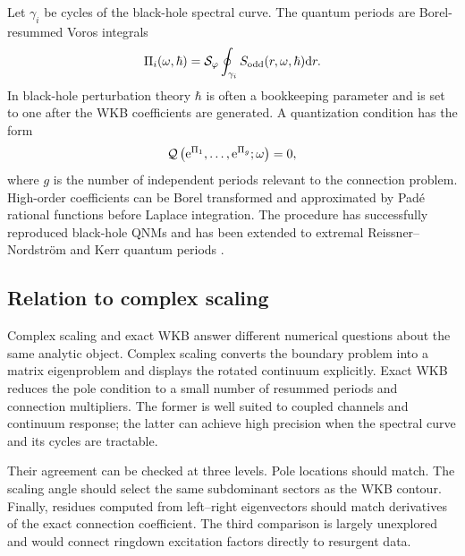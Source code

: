 Let $\gamma_i$ be cycles of the black-hole spectral curve.  The quantum
periods are Borel-resummed Voros integrals
\begin{equation}
  \Pi_i(\omega,\hbar)
  =\mathcal S_{\varphi}
  \oint_{\gamma_i}S_{\mathrm{odd}}(r,\omega,\hbar)\mathrm{d} r .
  \label{eq:bh-quantum-period}
\end{equation}
In black-hole perturbation theory $\hbar$ is often a bookkeeping parameter and
is set to one after the WKB coefficients are generated.  A quantization
condition has the form
\begin{equation}
  \mathcal Q\left(
  \mathrm{e}^{\Pi_1},\ldots,\mathrm{e}^{\Pi_g};\omega
  \right)=0 ,
  \label{eq:bh-exact-quantization}
\end{equation}
where $g$ is the number of independent periods relevant to the connection
problem.  High-order coefficients can be Borel transformed and approximated
by Pad\'e rational functions before Laplace integration.  The procedure has
successfully reproduced black-hole QNMs and has been extended to extremal
Reissner--Nordstr\"om and Kerr quantum periods
\cite{Hatsuda:2019eoj,Hatsuda:2023geo,HatsudaShiga:2026}.

\subsection{Relation to complex scaling}
\label{subsec:bh-wkb-csm-relation}

Complex scaling and exact WKB answer different numerical questions about the
same analytic object.  Complex scaling converts the boundary problem into a
matrix eigenproblem and displays the rotated continuum explicitly.  Exact WKB
reduces the pole condition to a small number of resummed periods and
connection multipliers.  The former is well suited to coupled channels and
continuum response; the latter can achieve high precision when the spectral
curve and its cycles are tractable.

Their agreement can be checked at three levels.  Pole locations should match.
The scaling angle should select the same subdominant sectors as the WKB
contour.  Finally, residues computed from left--right eigenvectors should match
derivatives of the exact connection coefficient.  The third comparison is
largely unexplored and would connect ringdown excitation factors directly to
resurgent data.

